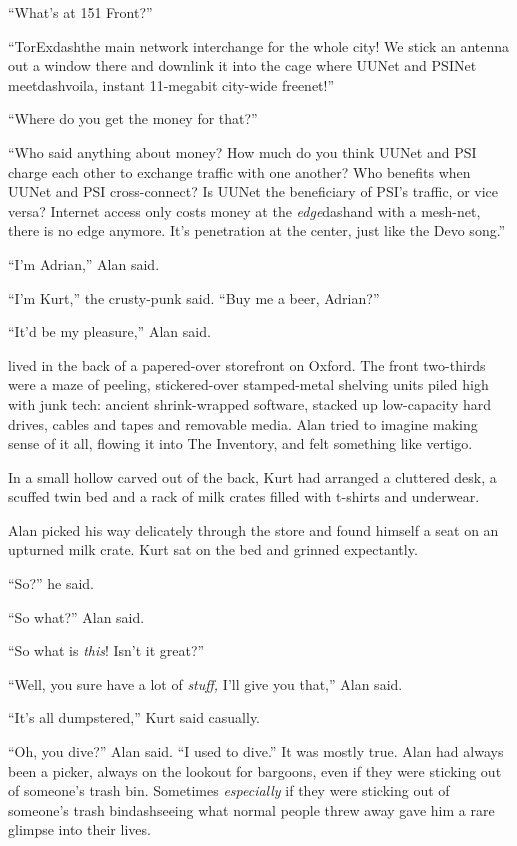 ``What's at 151 Front?''

``TorExdash{}the main network interchange for the whole city!  We stick
an antenna out a window there and downlink it into the cage where
UUNet and PSINet meetdash{}voila, instant 11-megabit city-wide freenet!''

``Where do you get the money for that?''

``Who said anything about money?  How much do you think UUNet and PSI
charge each other to exchange traffic with one another?  Who benefits
when UUNet and PSI cross-connect?  Is UUNet the beneficiary of PSI's
traffic, or vice versa?  Internet access only costs money at the
\textit{edge}dash{}and with a mesh-net, there is no edge anymore.  It's
penetration at the center, just like the Devo song.''

``I'm Adrian,'' Alan said.

``I'm Kurt,'' the crusty-punk said.  ``Buy me a beer, Adrian?''

``It'd be my pleasure,'' Alan said.

 lived in the back of a papered-over storefront on Oxford.  The
front two-thirds were a maze of peeling, stickered-over stamped-metal
shelving units piled high with junk tech:  ancient shrink-wrapped
software, stacked up low-capacity hard drives, cables and tapes and
removable media.  Alan tried to imagine making sense of it all,
flowing it into The Inventory, and felt something like vertigo.

In a small hollow carved out of the back, Kurt had arranged a
cluttered desk, a scuffed twin bed and a rack of milk crates filled
with t-shirts and underwear.

Alan picked his way delicately through the store and found himself a
seat on an upturned milk crate.  Kurt sat on the bed and grinned
expectantly.

``So?'' he said.

``So what?'' Alan said.

``So what is \textit{this}!  Isn't it great?''

``Well, you sure have a lot of \textit{stuff,} I'll give you that,''
Alan said.

``It's all dumpstered,'' Kurt said casually.

``Oh, you dive?'' Alan said.  ``I used to dive.'' It was mostly true. 
Alan had always been a picker, always on the lookout for bargoons,
even if they were sticking out of someone's trash bin.  Sometimes
\textit{especially} if they were sticking out of someone's trash
bindash{}seeing what normal people threw away gave him a rare glimpse
into their lives.


